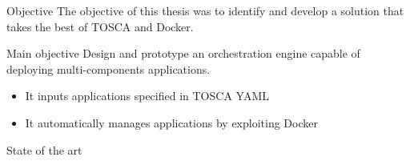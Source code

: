 \documentclass{beamer}
\begin{document}
  \begin{frame}{Objective}
    The objective of this thesis was to identify and develop a solution that takes the best of TOSCA and Docker.
    \begin{block}{Main objective}
      Design and prototype an orchestration engine capable of deploying multi-components applications.
      \begin{itemize}
        \item It inputs applications specified in TOSCA YAML
        \item It automatically manages applications by exploiting Docker
      \end{itemize}
    \end{block}
  \end{frame}

  \begin{frame}[t]{State of the art}
    \begin{columns}[T]
      \begin{column}{0.4\textwidth}
        \centering
\end{column}
\end{columns}
\end{frame}
\end{document}
